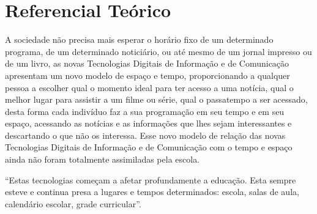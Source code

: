 \documentclass[12pt, openright, a4paper, brazil, english, french, spanish, bibjustif, openany, oneside]{abntex2}
\begin{document}




\chapter{Referencial Teórico}

A sociedade não precisa mais esperar o horário fixo de um determinado programa, de um determinado noticiário, ou até mesmo de um jornal impresso ou de um livro, as novas Tecnologias Digitais de Informação e de Comunicação apresentam um novo modelo de espaço e tempo, proporcionando a qualquer pessoa a escolher qual o momento ideal para ter acesso a uma notícia, qual o melhor lugar para assistir a um filme ou série, qual o passatempo a ser acessado, desta forma cada indivíduo faz a sua programação em seu tempo e em seu espaço, acessando as notícias e as informações que lhes sejam interessantes e descartando o que não os interessa. Esse novo modelo de relação das novas Tecnologias Digitais de Informação e de Comunicação com o tempo e espaço ainda não foram totalmente assimiladas pela escola.

\begin{citacao}

``Estas tecnologias começam a afetar profundamente a educação. Esta sempre esteve e continua presa a lugares e tempos determinados: escola, salas de aula, calendário escolar, grade curricular''\cite{moran}.

\end{citacao}
\end{document}
